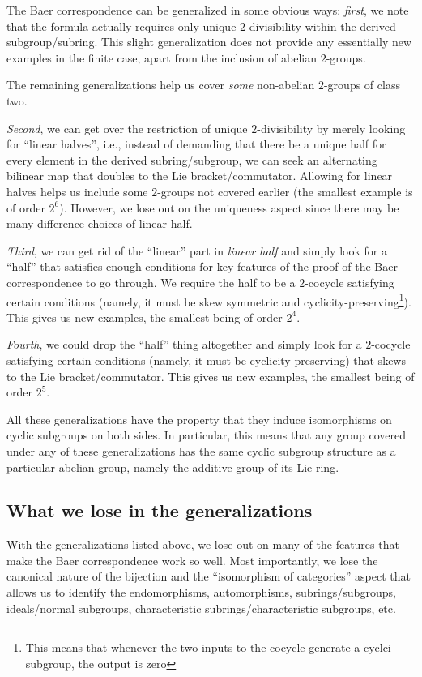 \documentclass[10pt]{amsart}
\begin{document}
The Baer correspondence can be generalized in some obvious ways: {\em
first}, we note that the formula actually requires only unique
$2$-divisibility within the derived subgroup/subring. This slight
generalization does not provide any essentially new examples in the
finite case, apart from the inclusion of abelian $2$-groups.

The remaining generalizations help us cover {\em some} non-abelian
$2$-groups of class two.

{\em Second}, we can get over the restriction of unique
$2$-divisibility by merely looking for ``linear halves'', i.e.,
instead of demanding that there be a unique half for every element in
the derived subring/subgroup, we can seek an alternating bilinear map
that doubles to the Lie bracket/commutator. Allowing for linear halves
helps us include some $2$-groups not covered earlier (the smallest
example is of order $2^6$). However, we lose out on the uniqueness
aspect since there may be many difference choices of linear half.

{\em Third}, we can get rid of the ``linear'' part in {\em linear
half} and simply look for a ``half'' that satisfies enough conditions
for key features of the proof of the Baer correspondence to go
through. We require the half to be a $2$-cocycle satisfying certain
conditions (namely, it must be skew symmetric and
cyclicity-preserving\footnote{This means that whenever the two inputs
to the cocycle generate a cyclci subgroup, the output is zero}). This
gives us new examples, the smallest being of order $2^4$.

{\em Fourth}, we could drop the ``half'' thing altogether and simply
look for a $2$-cocycle satisfying certain conditions (namely, it must
be cyclicity-preserving) that skews to the Lie
bracket/commutator. This gives us new examples, the smallest being of
order $2^5$.

All these generalizations have the property that they induce
isomorphisms on cyclic subgroups on both sides. In particular, this
means that any group covered under any of these generalizations has
the same cyclic subgroup structure as a particular abelian group,
namely the additive group of its Lie ring.

\subsection*{What we lose in the generalizations}

With the generalizations listed above, we lose out on many of the
features that make the Baer correspondence work so well. Most
importantly, we lose the canonical nature of the bijection and the
``isomorphism of categories'' aspect that allows us to identify the
endomorphisms, automorphisms, subrings/subgroups, ideals/normal
subgroups, characteristic subrings/characteristic subgroups,
etc.
\end{document}
